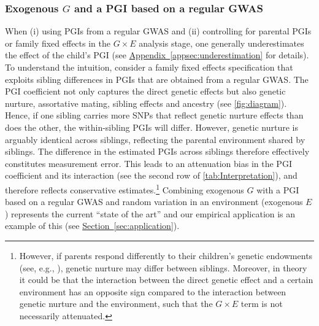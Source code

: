 \documentclass[12pt,a4paper]{article}
\begin{document}
\begin{bibunit}
\subsubsection{Exogenous \texorpdfstring{$G$}{} and a PGI based on a regular GWAS}
\label{subsec:lessideal}

When (i) using PGIs from a regular GWAS and (ii) controlling for parental PGIs or family fixed effects in the $G \times E$ analysis stage, one generally underestimates the effect of the child's PGI (see \hyperref[appsec:underestimation]{Appendix~\ref*{appsec:underestimation}} for details). To understand the intuition, consider a family fixed effects specification that exploits sibling differences in PGIs that are obtained from a regular GWAS. The PGI coefficient not only captures the direct genetic effects but also genetic nurture, assortative mating, sibling effects and ancestry (see \autoref{fig:diagram}). Hence, if one sibling carries more SNPs that reflect genetic nurture effects than does the other, the within-sibling PGIs will differ. However, genetic nurture is arguably identical across siblings, reflecting the parental environment shared by siblings. The difference in the estimated PGIs across siblings therefore effectively constitutes measurement error. This leads to an attenuation bias in the PGI coefficient \citep{Trejo2019} and its interaction (see the second row of \autoref{tab:Interpretation}), and therefore reflects conservative estimates.\footnote{However, if parents respond differently to their children's genetic endowments (see, e.g., \citealt{Sanz-de-galdeano2022}), genetic nurture may differ between siblings. Moreover, in theory it could be that the interaction between the direct genetic effect and a certain environment has an opposite sign compared to the interaction between genetic nurture and the environment, such that the $G \times E$ term is not necessarily attenuated.} Combining exogenous $G$ with a PGI based on a regular GWAS and random variation in an environment (exogenous $E$) represents the current ``state of the art'' and our empirical application is an example of this (see \hyperref[sec:application]{Section~\ref*{sec:application}}). 


\end{bibunit}
\end{document}
